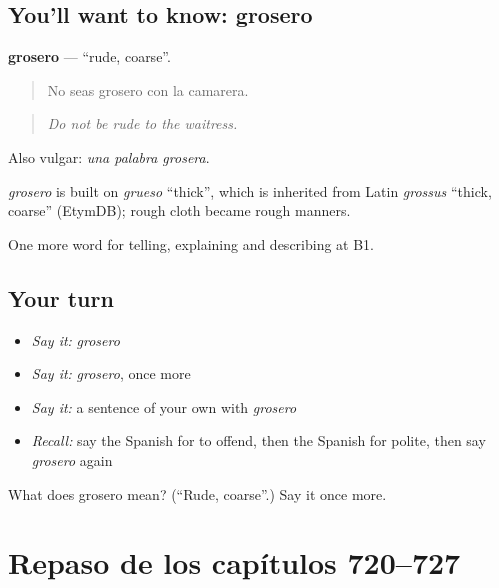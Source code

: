 \subsection*{You'll want to know: grosero}
\textbf{grosero} — \textquotedblleft{}rude, coarse\textquotedblright{}.

\begin{quote}
No seas grosero con la camarera.
\end{quote}

\begin{quote}
\emph{Do not be rude to the waitress.}
\end{quote}

Also vulgar: \emph{una palabra grosera}.

\begin{cousinweb}
\emph{grosero} is built on \emph{grueso} \textquotedblleft{}thick\textquotedblright{}, which is inherited from Latin \emph{grossus} \textquotedblleft{}thick, coarse\textquotedblright{} (EtymDB); rough cloth became rough manners.
\end{cousinweb}

\begin{grammarlens}[title={What you've built}]
One more word for telling, explaining and describing at B1.
\end{grammarlens}

\subsection*{Your turn}
\begin{itemize}
\raggedright
  \item \emph{Say it:} \emph{grosero}
  \item \emph{Say it:} \emph{grosero}, once more
  \item \emph{Say it:} a sentence of your own with \emph{grosero}
  \item \emph{Recall:} say the Spanish for to offend, then the Spanish for polite, then say \emph{grosero} again
\end{itemize}

\begin{tcolorbox}[breakable,colback=teal!4,colframe=teal!35!black,title={Before you move on}]
What does grosero mean? (\textquotedblleft{}Rude, coarse\textquotedblright{}.) Say it once more.
\end{tcolorbox}
\section[(dialogue)]{Repaso de los capítulos 720–727}

